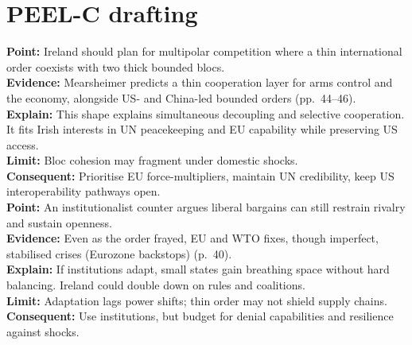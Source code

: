 \section*{PEEL-C drafting}

\textbf{Point:} Ireland should plan for multipolar competition where a thin international order coexists with two thick bounded blocs.\\
\textbf{Evidence:} Mearsheimer predicts a thin cooperation layer for arms control and the economy, alongside US- and China-led bounded orders (pp.~44--46).\\
\textbf{Explain:} This shape explains simultaneous decoupling and selective cooperation. It fits Irish interests in UN peacekeeping and EU capability while preserving US access.\\
\textbf{Limit:} Bloc cohesion may fragment under domestic shocks.\\
\textbf{Consequent:} Prioritise EU force-multipliers, maintain UN credibility, keep US interoperability pathways open.\\[1em]

\textbf{Point:} An institutionalist counter argues liberal bargains can still restrain rivalry and sustain openness.\\
\textbf{Evidence:} Even as the order frayed, EU and WTO fixes, though imperfect, stabilised crises (Eurozone backstops) (p.~40).\\
\textbf{Explain:} If institutions adapt, small states gain breathing space without hard balancing. Ireland could double down on rules and coalitions.\\
\textbf{Limit:} Adaptation lags power shifts; thin order may not shield supply chains.\\
\textbf{Consequent:} Use institutions, but budget for denial capabilities and resilience against shocks.\\[1em]

